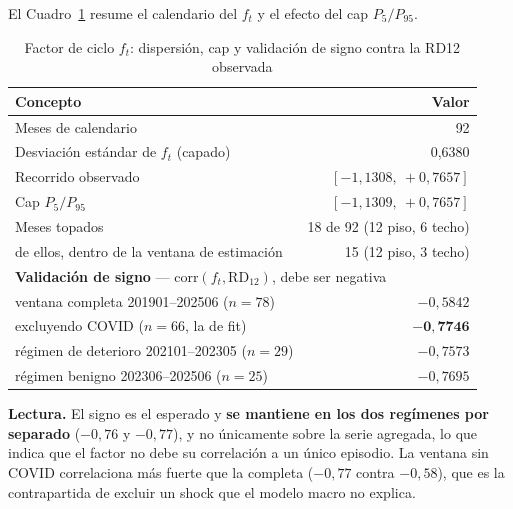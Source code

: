 \documentclass[12pt, a4paper]{article}
\newcommand{\RD}{\ensuremath{\mathrm{RD}}}
\newcommand{\ft}{\ensuremath{f_t}}
\begin{document}
El Cuadro~\ref{tab:ftcap} resume el calendario del $\ft$ y el efecto del cap $P_5/P_{95}$.

\begin{table}[H]
\centering
\caption{Factor de ciclo $\ft$: dispersión, cap y validación de signo contra la RD12 observada}
\label{tab:ftcap}
\small
\begin{tabular}{lr}
\toprule
\textbf{Concepto} & \textbf{Valor} \\
\midrule
Meses de calendario                        & 92 \\
Desviación estándar de $\ft$ (capado)      & 0,6380 \\
Recorrido observado                        & $[-1{,}1308,\ +0{,}7657]$ \\
Cap $P_5/P_{95}$                           & $[-1{,}1309,\ +0{,}7657]$ \\
Meses topados                              & 18 de 92 (12 piso, 6 techo) \\
\quad de ellos, dentro de la ventana de estimación & 15 (12 piso, 3 techo) \\
\midrule
\multicolumn{2}{l}{\textbf{Validación de signo} --- $\mathrm{corr}(\ft,\RD_{12})$, debe ser negativa} \\
\quad ventana completa 201901--202506 ($n=78$)     & $-0{,}5842$ \\
\quad excluyendo COVID ($n=66$, la de fit)          & $\mathbf{-0{,}7746}$ \\
\quad régimen de deterioro 202101--202305 ($n=29$)  & $-0{,}7573$ \\
\quad régimen benigno 202306--202506 ($n=25$)       & $-0{,}7695$ \\
\bottomrule
\end{tabular}
\end{table}

\noindent\textbf{Lectura.} El signo es el esperado y \textbf{se mantiene en los dos regímenes por
separado} ($-0{,}76$ y $-0{,}77$), y no únicamente sobre la serie agregada, lo que indica que el
factor no debe su correlación a un único episodio. La ventana sin COVID correlaciona más fuerte que la completa ($-0{,}77$ contra
$-0{,}58$), que es la contrapartida de excluir un shock que el modelo macro no explica.
\end{document}
